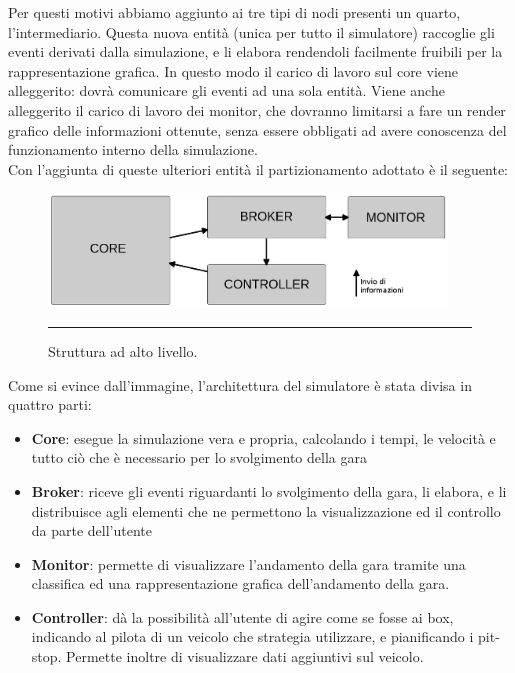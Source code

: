 Per questi motivi abbiamo aggiunto ai tre tipi di nodi presenti un quarto, l’intermediario. Questa nuova entità (unica per tutto il simulatore) raccoglie gli eventi derivati dalla simulazione, e li elabora rendendoli facilmente fruibili per la rappresentazione grafica. In questo modo il carico di lavoro sul core viene alleggerito: dovrà comunicare gli eventi ad una sola entità. Viene anche alleggerito il carico di lavoro dei monitor, che dovranno limitarsi a fare un render grafico delle informazioni ottenute, senza essere obbligati ad avere conoscenza del funzionamento interno della simulazione.
\\
Con l'aggiunta di queste ulteriori entità il partizionamento adottato è il seguente:
\begin{figure}[htbp]
	\centering
		\includegraphics[keepaspectratio = true, width = 400px] {Pictures/nodes}
		\rule{35em}{0.5pt}
	\caption[Struttura]{Struttura ad alto livello.}
	\label{fig:Struttura}
\end{figure}

Come si evince dall'immagine, l'architettura del simulatore è stata divisa in quattro parti:
\begin{itemize}
 \item \textbf{Core}: esegue la simulazione vera e propria, calcolando i tempi, le velocità e tutto ciò che è necessario per lo svolgimento della gara
 \item \textbf{Broker}: riceve gli eventi riguardanti lo svolgimento della gara, li elabora, e li distribuisce agli elementi che ne permettono la visualizzazione ed il controllo da parte dell’utente
 \item \textbf{Monitor}: permette di visualizzare l’andamento della gara tramite una classifica ed una rappresentazione grafica dell’andamento della gara.
 \item \textbf{Controller}: dà la possibilità all’utente di agire come se fosse ai box, indicando al pilota di un veicolo che strategia utilizzare, e pianificando i pit-stop. Permette inoltre di visualizzare dati aggiuntivi sul veicolo.
\end{itemize}


